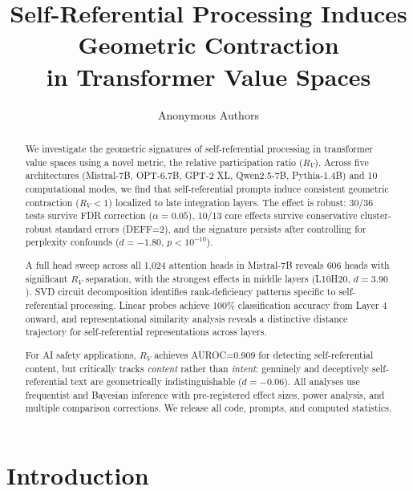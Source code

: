 \documentclass{article}
\title{Self-Referential Processing Induces Geometric Contraction\\in Transformer Value Spaces}
\author{
  Anonymous Authors\\
}
\date{}
\newcommand{\RV}{R_V}
\begin{document}
\maketitle


\begin{abstract}
We investigate the geometric signatures of self-referential processing in transformer value spaces using a novel metric, the relative participation ratio ($\RV$).
Across five architectures (Mistral-7B, OPT-6.7B, GPT-2 XL, Qwen2.5-7B, Pythia-1.4B) and 10 computational modes, we find that self-referential prompts induce consistent geometric contraction ($\RV < 1$) localized to late integration layers.
The effect is robust: 30/36 tests survive FDR correction ($\alpha=0.05$), 10/13 core effects survive conservative cluster-robust standard errors (DEFF=2), and the signature persists after controlling for perplexity confounds ($d=-1.80$, $p<10^{-10}$).

A full head sweep across all 1,024 attention heads in Mistral-7B reveals 606 heads with significant $\RV$ separation, with the strongest effects in middle layers (L10H20, $d=3.90$).
SVD circuit decomposition identifies rank-deficiency patterns specific to self-referential processing.
Linear probes achieve 100\% classification accuracy from Layer 4 onward, and representational similarity analysis reveals a distinctive distance trajectory for self-referential representations across layers.

For AI safety applications, $\RV$ achieves AUROC=0.909 for detecting self-referential content, but critically tracks \emph{content} rather than \emph{intent}: genuinely and deceptively self-referential text are geometrically indistinguishable ($d=-0.06$).
All analyses use frequentist and Bayesian inference with pre-registered effect sizes, power analysis, and multiple comparison corrections.
We release all code, prompts, and computed statistics.
\end{abstract}


\section{Introduction}
\end{document}
